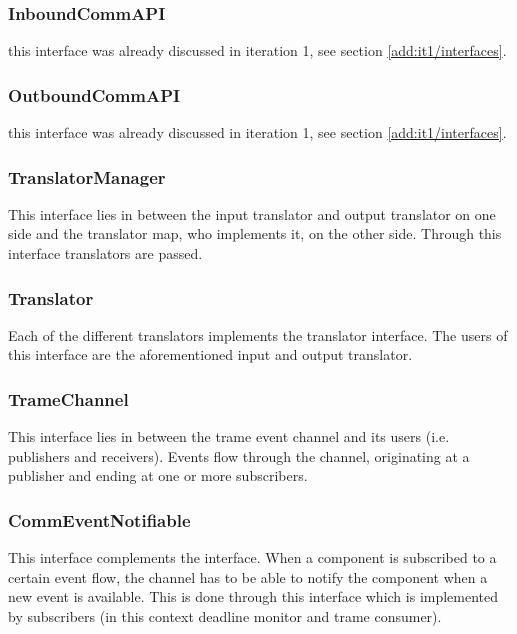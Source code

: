 \subsubsection{InboundCommAPI}

\npar this interface was already discussed in iteration 1, see section
\ref{add:it1/interfaces}.

\subsubsection{OutboundCommAPI}

\npar this interface was already discussed in iteration 1, see section
\ref{add:it1/interfaces}.

\subsubsection{TranslatorManager}

\npar This interface lies in between the input translator and output translator
on one side and the translator map, who implements it, on the other side.
Through this interface translators are passed.

\subsubsection{Translator}

\npar Each of the different translators implements the 
translator interface. The users of this interface are the aforementioned input
and output translator.

\subsubsection{TrameChannel}

\npar This interface lies in between the trame event channel and its users
(i.e. publishers and receivers). Events flow through the channel, originating at
a publisher and ending at one or more subscribers.

\subsubsection{CommEventNotifiable}

\npar This interface complements the  interface. When a
component is subscribed to a certain event flow, the channel has to be able to
notify the component when a new event is available. This is done through this
interface which is implemented by subscribers (in this context deadline monitor
and trame consumer).

